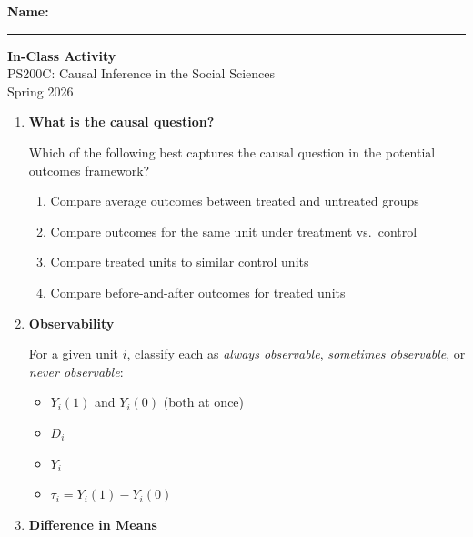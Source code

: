 \documentclass[12pt]{article}
\begin{document}
\noindent
\textbf{Name:} \rule{3in}{0.4pt}

\vspace{0.5cm}

\begin{center}
    {\Large \textbf{In-Class Activity}}\\[0.2cm]
    {\large PS200C: Causal Inference in the Social Sciences}\\
    {\large Spring 2026}
\end{center}

\vspace{0.5cm}

\begin{enumerate}

\item \textbf{What is the causal question?}

Which of the following best captures the causal question in the potential outcomes framework?

\begin{enumerate}[label=(\alph*)]
    \item Compare average outcomes between treated and untreated groups
    \item Compare outcomes for the same unit under treatment vs.\ control
    \item Compare treated units to similar control units
    \item Compare before-and-after outcomes for treated units
\end{enumerate}

\vspace{0.8cm}

\item \textbf{Observability}

For a given unit $i$, classify each as \emph{always observable}, \emph{sometimes observable}, or \emph{never observable}:

\begin{itemize}
    \item $Y_i(1)$ and $Y_i(0)$ (both at once)
    \item $D_i$
    \item $Y_i$
    \item $\tau_i = Y_i(1) - Y_i(0)$
\end{itemize}

\vspace{1cm}

\item \textbf{Difference in Means}


\end{enumerate}
\end{document}
